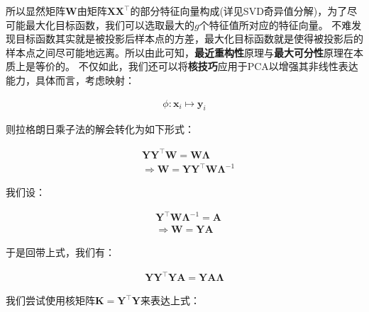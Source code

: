 \documentclass[UTF8]{book}
\begin{document}
所以显然矩阵$\mathbf{W}$由矩阵$\mathbf{X}\mathbf{X}^\top$的部分特征向量构成(详见SVD奇异值分解)，为了尽可能最大化目标函数，我们可以选取最大的$g$个特征值所对应的特征向量。
不难发现目标函数其实就是被投影后样本点的方差，最大化目标函数就是使得被投影后的样本点之间尽可能地远离。所以由此可知，\textbf{最近重构性}原理与\textbf{最大可分性}原理在本质上是等价的。
不仅如此，我们还可以将\textbf{核技巧}应用于PCA以增强其非线性表达能力，具体而言，考虑映射：
\begin{large}
    \begin{equation}
        \begin{aligned}
            \phi : \mathbf{x}_i \mapsto \mathbf{y}_i
            \nonumber
        \end{aligned}
    \end{equation}
\end{large}
则拉格朗日乘子法的解会转化为如下形式：
\begin{large}
    \begin{equation}
        \begin{aligned}
            &\mathbf{Y}\mathbf{Y}^\top \mathbf{W} = \mathbf{W}\mathbf{\Lambda} \\
            &\Rightarrow \mathbf{W} = \mathbf{Y}\mathbf{Y}^\top \mathbf{W} \mathbf{\Lambda}^{-1}
            \nonumber
        \end{aligned}
    \end{equation}
\end{large}
我们设：
\begin{large}
    \begin{equation}
        \begin{aligned}
            &\mathbf{Y}^\top\mathbf{W}\mathbf{\Lambda}^{-1} = \mathbf{A} \\
            &\Rightarrow \mathbf{W} = \mathbf{Y}\mathbf{A}
            \nonumber
        \end{aligned}
    \end{equation}
\end{large}
于是回带上式，我们有：
\begin{large}
    \begin{equation}
        \begin{aligned}
            \mathbf{Y}\mathbf{Y}^\top\mathbf{Y}\mathbf{A}=\mathbf{Y}\mathbf{A}\mathbf{\Lambda}
            \nonumber
        \end{aligned}
    \end{equation}
\end{large}
我们尝试使用核矩阵$\mathbf{K}=\mathbf{Y}^\top\mathbf{Y}$来表达上式：
\end{document}
